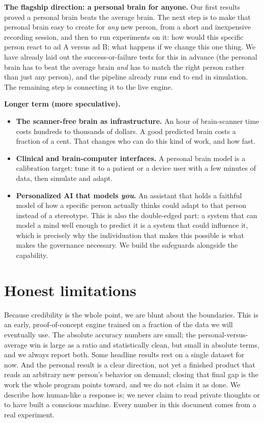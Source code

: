 \documentclass[11pt]{article}
\begin{document}
\textbf{The flagship direction: a personal brain for anyone.} Our first results proved a
personal brain beats the average brain. The next step is to make that personal brain easy to
create for \emph{any} new person, from a short and inexpensive recording session, and then to
run experiments on it: how would this specific person react to ad A versus ad B; what happens
if we change this one thing. We have already laid out the success-or-failure tests for this in
advance (the personal brain has to beat the average brain \emph{and} has to match the right
person rather than just any person), and the pipeline already runs end to end in simulation.
The remaining step is connecting it to the live engine.

\textbf{Longer term (more speculative).}
\begin{itemize}
\item \textbf{The scanner-free brain as infrastructure.} An hour of brain-scanner time costs
hundreds to thousands of dollars. A good predicted brain costs a fraction of a cent. That
changes who can do this kind of work, and how fast.
\item \textbf{Clinical and brain-computer interfaces.} A personal brain model is a calibration
target: tune it to a patient or a device user with a few minutes of data, then simulate and
adapt.
\item \textbf{Personalized AI that models \emph{you}.} An assistant that holds a faithful model
of how a specific person actually thinks could adapt to that person instead of a stereotype.
This is also the double-edged part: a system that can model a mind well enough to predict it is
a system that could influence it, which is precisely why the individuation that makes this
possible is what makes the governance necessary. We build the safeguards alongside the
capability.
\end{itemize}

\section{Honest limitations}

Because credibility is the whole point, we are blunt about the boundaries. This is an early,
proof-of-concept engine trained on a fraction of the data we will eventually use. The
absolute accuracy numbers are small; the personal-versus-average win is large as a ratio and
statistically clean, but small in absolute terms, and we always report both. Some headline
results rest on a single dataset for now. And the personal result is a clear direction, not yet
a finished product that reads an arbitrary new person's behavior on demand; closing that final
gap is the work the whole program points toward, and we do not claim it as done. We describe
how human-like a response is; we never claim to read private thoughts or to have built a
conscious machine. Every number in this document comes from a real experiment.
\end{document}
